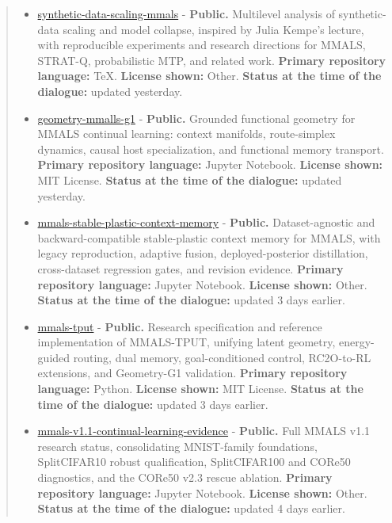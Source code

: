 \begin{quote}
\begin{itemize}
\tightlist
\item
  \href{https://github.com/gharbonnier78/synthetic-data-scaling-mmals}{synthetic-data-scaling-mmals} - \textbf{Public.} Multilevel analysis of synthetic-data scaling and model collapse, inspired by Julia Kempe's lecture, with reproducible experiments and research directions for MMALS, STRAT-Q, probabilistic MTP, and related work. \textbf{Primary repository language:} TeX. \textbf{License shown:} Other. \textbf{Status at the time of the dialogue:} updated yesterday.
\item
  \href{https://github.com/gharbonnier78/geometry-mmalls-g1}{geometry-mmalls-g1} - \textbf{Public.} Grounded functional geometry for MMALS continual learning: context manifolds, route-simplex dynamics, causal host specialization, and functional memory transport. \textbf{Primary repository language:} Jupyter Notebook. \textbf{License shown:} MIT License. \textbf{Status at the time of the dialogue:} updated yesterday.
\item
  \href{https://github.com/gharbonnier78/mmals-stable-plastic-context-memory}{mmals-stable-plastic-context-memory} - \textbf{Public.} Dataset-agnostic and backward-compatible stable-plastic context memory for MMALS, with legacy reproduction, adaptive fusion, deployed-posterior distillation, cross-dataset regression gates, and revision evidence. \textbf{Primary repository language:} Jupyter Notebook. \textbf{License shown:} Other. \textbf{Status at the time of the dialogue:} updated 3 days earlier.
\item
  \href{https://github.com/gharbonnier78/mmals-tput}{mmals-tput} - \textbf{Public.} Research specification and reference implementation of MMALS-TPUT, unifying latent geometry, energy-guided routing, dual memory, goal-conditioned control, RC2O-to-RL extensions, and Geometry-G1 validation. \textbf{Primary repository language:} Python. \textbf{License shown:} MIT License. \textbf{Status at the time of the dialogue:} updated 3 days earlier.
\item
  \href{https://github.com/gharbonnier78/mmals-v1.1-continual-learning-evidence}{mmals-v1.1-continual-learning-evidence} - \textbf{Public.} Full MMALS v1.1 research status, consolidating MNIST-family foundations, SplitCIFAR10 robust qualification, SplitCIFAR100 and CORe50 diagnostics, and the CORe50 v2.3 rescue ablation. \textbf{Primary repository language:} Jupyter Notebook. \textbf{License shown:} Other. \textbf{Status at the time of the dialogue:} updated 4 days earlier.

\end{itemize}
\end{quote}

